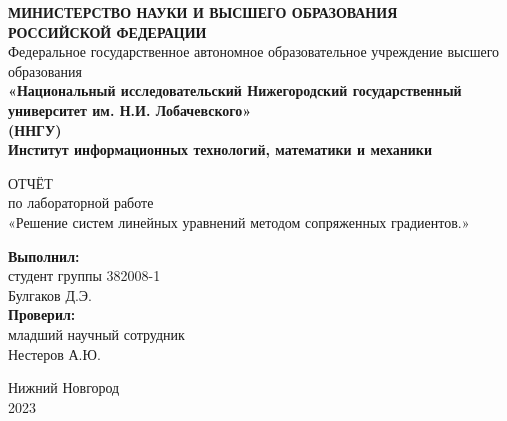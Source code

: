 \documentclass[14pt, russian]{extarticle}
\title{}
\author{}
\date{}
\begin{document}
	\begin{titlepage}
		\begin{center}
			{\bfseries МИНИСТЕРСТВО НАУКИ И ВЫСШЕГО ОБРАЗОВАНИЯ \\
				РОССИЙСКОЙ ФЕДЕРАЦИИ}
			\\
			Федеральное государственное автономное образовательное учреждение высшего образования 
			\\
			{\bfseries «Национальный исследовательский Нижегородский государственный университет им. Н.И. Лобачевского»\\(ННГУ)
				\\Институт информационных технологий, математики и механики} \\
		\end{center}
		
		\vspace{8em}
		
		\begin{center}
			ОТЧЁТ \\ по лабораторной работе \\
			«Решение систем линейных уравнений методом сопряженных градиентов.»
		\end{center}
		
		\vspace{5em}
		
		
		\begin{flushright}
			{\bfseries Выполнил:} \\студент группы 382008-1\\Булгаков Д.Э.\\ 
			{\bfseries Проверил:} \\младший научный сотрудник\\Нестеров А.Ю.
		\end{flushright}
		
		
		\vspace{\fill}
		
		\begin{center}
			Нижний Новгород\\2023
		\end{center}
		
	\end{titlepage}
	
	\tableofcontents
	\thispagestyle{empty}
	\newpage
	
	\pagestyle{plain}
	\setcounter{page}{3}

\end{document}
